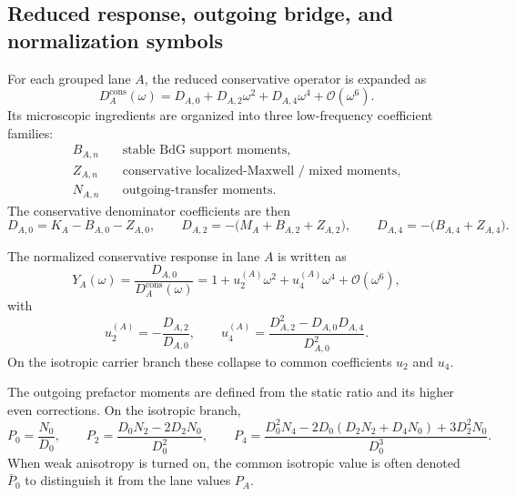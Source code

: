 \documentclass[11pt]{article}
\theoremstyle{definition}
\newcommand{\cO}{\mathcal O}
\begin{document}
\subsection{Reduced response, outgoing bridge, and normalization symbols}

For each grouped lane $A$, the reduced conservative operator is expanded as
\begin{equation}
D_A^{\mathrm{cons}}(\omega)=D_{A,0}+D_{A,2}\omega^2+D_{A,4}\omega^4+\cO(\omega^6).
\label{eq:appendix-DA-expansion}
\end{equation}
Its microscopic ingredients are organized into three low-frequency coefficient families:
\begin{align}
B_{A,n} &\quad \text{stable BdG support moments},\nonumber\\
Z_{A,n} &\quad \text{conservative localized-Maxwell / mixed moments},\nonumber\\
N_{A,n} &\quad \text{outgoing-transfer moments}.\label{eq:appendix-BZN-families}
\end{align}
The conservative denominator coefficients are then
\begin{equation}
D_{A,0}=K_A-B_{A,0}-Z_{A,0},
\qquad
D_{A,2}=-\bigl(M_A+B_{A,2}+Z_{A,2}\bigr),
\qquad
D_{A,4}=-\bigl(B_{A,4}+Z_{A,4}\bigr).
\label{eq:appendix-D-coefficients}
\end{equation}

The normalized conservative response in lane $A$ is written as
\begin{equation}
Y_A(\omega)=\frac{D_{A,0}}{D_A^{\mathrm{cons}}(\omega)}
=1+u_2^{(A)}\omega^2+u_4^{(A)}\omega^4+\cO(\omega^6),
\label{eq:appendix-YA-expansion}
\end{equation}
with
\begin{equation}
u_2^{(A)}=-\frac{D_{A,2}}{D_{A,0}},
\qquad
u_4^{(A)}=\frac{D_{A,2}^2-D_{A,0}D_{A,4}}{D_{A,0}^2}.
\label{eq:appendix-u2-u4-def}
\end{equation}
On the isotropic carrier branch these collapse to common coefficients $u_2$ and $u_4$.

The outgoing prefactor moments are defined from the static ratio and its higher even corrections. On the isotropic branch,
\begin{equation}
P_0=\frac{N_0}{D_0},
\qquad
P_2=\frac{D_0N_2-2D_2N_0}{D_0^2},
\qquad
P_4=\frac{D_0^2N_4-2D_0(D_2N_2+D_4N_0)+3D_2^2N_0}{D_0^3}.
\label{eq:appendix-P-moments}
\end{equation}
When weak anisotropy is turned on, the common isotropic value is often denoted $\bar P_0$ to distinguish it from the lane values $P_A$.
\end{document}
